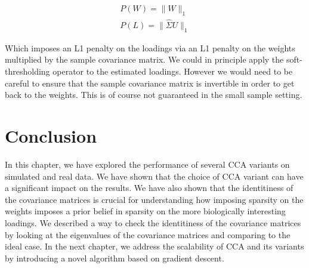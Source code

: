 \begin{align}
    P(W)=\|W\|_1 \\
    P(L)=\|\hat{\Sigma}U\|_1
\end{align}

Which imposes an L1 penalty on the loadings via an L1 penalty on the weights multiplied by the sample covariance matrix.
We could in principle apply the soft-thresholding operator to the estimated loadings.
However we would need to be careful to ensure that the sample covariance matrix is invertible in order to get back to the weights.
This is of course not guaranteed in the small sample setting.

\section{Conclusion}

In this chapter, we have explored the performance of several CCA variants on simulated and real data.
We have shown that the choice of CCA variant can have a significant impact on the results.
We have also shown that the identitiness of the covariance matrices is crucial for understanding how imposing sparsity on the weights imposes a prior belief in sparsity on the more biologically interesting loadings.
We described a way to check the identitiness of the covariance matrices by looking at the eigenvalues of the covariance matrices and comparing to the ideal case.
In the next chapter, we address the scalability of CCA and its variants by introducing a novel algorithm based on gradient descent.